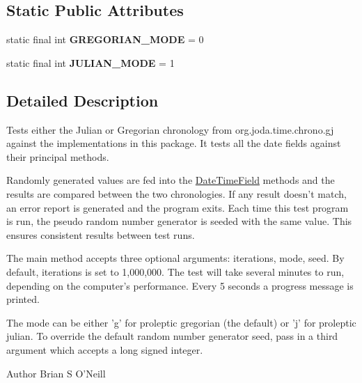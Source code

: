 \subsection*{Static Public Attributes}
\begin{DoxyCompactItemize}
\item 
\hypertarget{classorg_1_1joda_1_1time_1_1chrono_1_1gj_1_1_main_test_a1badcf0b7bac78be55535f6ed9d87310}{static final int {\bfseries G\-R\-E\-G\-O\-R\-I\-A\-N\-\_\-\-M\-O\-D\-E} = 0}\label{classorg_1_1joda_1_1time_1_1chrono_1_1gj_1_1_main_test_a1badcf0b7bac78be55535f6ed9d87310}

\item 
\hypertarget{classorg_1_1joda_1_1time_1_1chrono_1_1gj_1_1_main_test_afcccce22a15beb966ebd1694a905f668}{static final int {\bfseries J\-U\-L\-I\-A\-N\-\_\-\-M\-O\-D\-E} = 1}\label{classorg_1_1joda_1_1time_1_1chrono_1_1gj_1_1_main_test_afcccce22a15beb966ebd1694a905f668}

\end{DoxyCompactItemize}


\subsection{Detailed Description}
Tests either the Julian or Gregorian chronology from org.\-joda.\-time.\-chrono.\-gj against the implementations in this package. It tests all the date fields against their principal methods. 

Randomly generated values are fed into the \hyperlink{classorg_1_1joda_1_1time_1_1_date_time_field}{Date\-Time\-Field} methods and the results are compared between the two chronologies. If any result doesn't match, an error report is generated and the program exits. Each time this test program is run, the pseudo random number generator is seeded with the same value. This ensures consistent results between test runs. 

The main method accepts three optional arguments\-: iterations, mode, seed. By default, iterations is set to 1,000,000. The test will take several minutes to run, depending on the computer's performance. Every 5 seconds a progress message is printed. 

The mode can be either 'g' for proleptic gregorian (the default) or 'j' for proleptic julian. To override the default random number generator seed, pass in a third argument which accepts a long signed integer.

\begin{DoxyAuthor}{Author}
Brian S O'Neill 
\end{DoxyAuthor}


